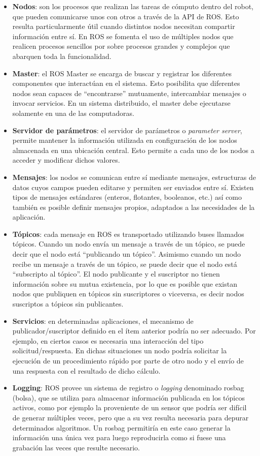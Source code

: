 \begin{itemize}
    \item \textbf{Nodos}: son los procesos que realizan las tareas de cómputo dentro del robot, que pueden comunicarse unos con otros a través de la API de ROS. Esto resulta particularmente útil cuando distintos nodos necesitan compartir información entre sí. En ROS se fomenta el uso de múltiples nodos que realicen procesos sencillos por sobre procesos grandes y complejos que abarquen toda la funcionalidad.
    \item \textbf{Master}: el ROS Master se encarga de buscar y registrar los diferentes componentes que interactúan en el sistema. Esto posibilita que diferentes nodos sean capaces de ``encontrarse'' mutuamente, intercambiar mensajes o invocar servicios. En un sistema distribuido, el master debe ejecutarse solamente en una de las computadoras.
    \item \textbf{Servidor de parámetros}: el servidor de parámetros o \textit{parameter server}, permite mantener la información utilizada en configuración de los nodos almacenada en una ubicación central. Esto permite a cada uno de los nodos a acceder y modificar dichos valores.
    \item \textbf{Mensajes}: los nodos se comunican entre sí mediante mensajes, estructuras de datos cuyos campos pueden editarse y permiten ser enviados entre sí. Existen tipos de mensajes estándares (enteros, flotantes, booleanos, etc.) así como también es posible definir mensajes propios, adaptados a las necesidades de la aplicación.
    \item \textbf{Tópicos}: cada mensaje en ROS es transportado utilizando buses llamados tópicos. Cuando un nodo envía un mensaje a través de un tópico, se puede decir que el nodo está ``publicando un tópico''. Asimismo cuando un nodo recibe un mensaje a través de un tópico, se puede decir que el nodo está ``subscripto al tópico''. El nodo publicante y el suscriptor no tienen información sobre su mutua existencia, por lo que es posible que existan nodos que publiquen en tópicos sin suscriptores o viceversa, es decir nodos suscriptos a tópicos sin publicantes.
    \item \textbf{Servicios}: en determinadas aplicaciones, el mecanismo de publicador/suscriptor definido en el ítem anterior podría no ser adecuado. Por ejemplo, en ciertos casos es necesaria una interacción del tipo solicitud/respuesta. En dichas situaciones un nodo podría solicitar la ejecución de un procedimiento rápido por parte de otro nodo y el envío de una respuesta con el resultado de dicho cálculo.
    \item \textbf{Logging}: ROS provee un sistema de registro o \textit{logging} denominado rosbag (bolsa), que se utiliza para almacenar información publicada en los tópicos activos, como por ejemplo la proveniente de un sensor que podría ser difícil de generar múltiples veces, pero que a su vez resulta necesaria para depurar determinados algoritmos. Un rosbag permitiría en este caso generar la información una única vez para luego reproducirla como si fuese una grabación las veces que resulte necesario.
\end{itemize}

